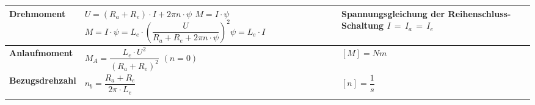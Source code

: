 \renewcommand{\arraystretch}{2.5}
\begin{tabular}{| C{4cm} | P{7cm} | P{7cm} |}
	\firsthline
	\textbf{Drehmoment}	& $U = (R_a + R_e)\cdot I + 2\pi n\cdot\psi$ \newline \newline $M = I\cdot\psi$ \newline \newline $M = I\cdot\psi = L_e\cdot\left(\dfrac{U}{R_a + R_e + 2\pi n\cdot\psi}\right)^2$\newline \newline $\psi = L_e\cdot I$ & Spannungsgleichung der Reihenschluss-Schaltung \newline \newline $I\,=\,I_a\,=\,I_e$  \\
	\hline
	\textbf{Anlaufmoment}	& $M_A = \dfrac{L_e\cdot U^2}{\left(R_a + R_e\right)^2}$ \qquad $\left(n = 0\right)$ & $[M] = Nm$ \newline \\
	\hline
	\textbf{Bezugsdrehzahl}& $n_b = \dfrac{R_a + R_e}{2\pi\cdot L_e}$ \newline & $[n] = \dfrac{1}{s}$ \\
	\lasthline
\end{tabular}


